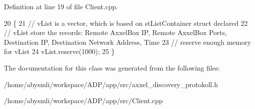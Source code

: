 Definition at line 19 of file Client.\-cpp.


\begin{DoxyCode}
20 \{
21     \textcolor{comment}{// vList is a vector, which is based on stListContainer struct declared}
22     \textcolor{comment}{// vList store the records: Remote AxxelBox IP, Remote AxxelBox Ports, Destination IP, Destination
       Network Address, Time}
23     \textcolor{comment}{// reserve enough memory for vList}
24     vList.reserve(1000);
25 \}
\end{DoxyCode}


The documentation for this class was generated from the following files\-:\begin{DoxyCompactItemize}
\item 
/home/abysmli/workspace/\-A\-D\-P/app/src/axxel\-\_\-discovery\-\_\-protokoll.\-h\item 
/home/abysmli/workspace/\-A\-D\-P/app/src/Client.\-cpp\end{DoxyCompactItemize}
